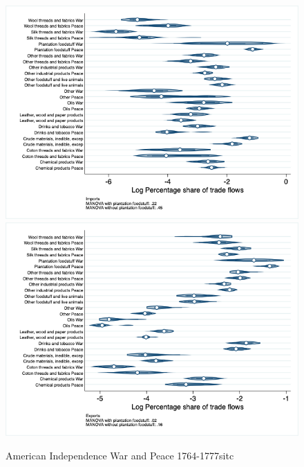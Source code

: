 \documentclass[12pt,a4paper,notitlepage,english]{article}
\begin{document}
\begin{figure}
\centering
\caption{American Independence War and Peace 1764-1777sitc}
\label{peace1764_1777_indep_nat_distr}
\includegraphics[scale=.4]{peace1764_1777_indep_nat_distr_Isitc}
\includegraphics[scale=.4]{peace1764_1777_indep_nat_distr_Xsitc}
\end{figure}
\end{document}
